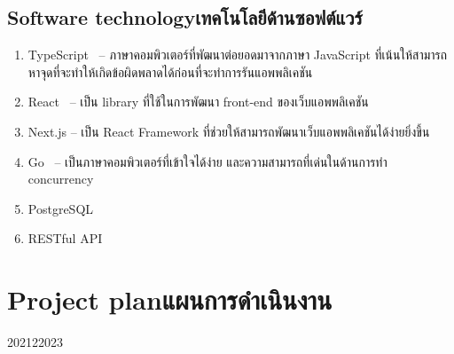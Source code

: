 \subsection{\ifenglish Software technology\else เทคโนโลยีด้านซอฟต์แวร์\fi}
\begin{enumerate}
    \item TypeScript~\cite{typescript} -- ภาษาคอมพิวเตอร์ที่พัฒนาต่อยอดมาจากภาษา JavaScript 
        ที่เน้นให้สามารถหาจุดที่จะทำให้เกิดข้อผิดพลาดได้ก่อนที่จะทำการรันแอพพลิเคชัน
    \item React~\cite{react} -- เป็น library ที่ใช้ในการพัฒนา front-end ของเว็บแอพพลิเคชัน
    \item Next.js\cite{nextjs} -- เป็น React Framework ที่ช่วยให้สามารถพัฒนาเว็บแอพพลิเคชันได้ง่ายยิ่งขึ้น
    \item Go~\cite{golang} -- เป็นภาษาคอมพิวเตอร์ที่เข้าใจได้ง่าย และความสามารถที่เด่นในด้านการทำ concurrency
    \item PostgreSQL
    \item RESTful API
\end{enumerate}

\section{\ifenglish Project plan\else แผนการดำเนินงาน\fi}
\begin{plan}{12}{2021}{2}{2023}
\end{plan}

